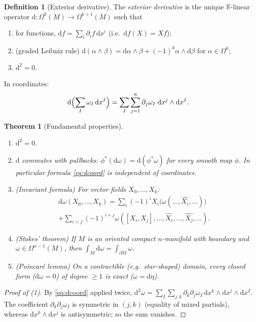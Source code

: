 \documentclass[11pt,a4paper]{article}
\newcounter{thm}[section]
\numberwithin{equation}{section}
\theoremstyle{definition}
\newtheorem{definition}[thm]{Definition}
\theoremstyle{plain}
\newtheorem{theorem}[thm]{Theorem}
\newcommand{\R}{\mathbb{R}}
\newcommand{\dd}{\mathrm{d}}
\begin{document}
\begin{definition}[Exterior derivative]\label{def:d}
The \emph{exterior derivative} is the unique $\R$-linear operator $\dd:\Omega^k(M)\to\Omega^{k+1}(M)$ such that
\begin{enumerate}
  \item for functions, $\dd f=\sum_i\partial_if\,\dd x^i$ (i.e.\ $\dd f(X)=Xf$);
  \item (graded Leibniz rule) $\dd(\alpha\wedge\beta)=\dd\alpha\wedge\beta+(-1)^k\alpha\wedge\dd\beta$ for $\alpha\in\Omega^k$;
  \item $\dd^2=0$.
\end{enumerate}
In coordinates:
\begin{equation}\label{eq:dcoord}
 \dd\Bigl(\sum_I\omega_I\,\dd x^I\Bigr)=\sum_I\sum_{j=1}^n\partial_j\omega_I\;\dd x^j\wedge\dd x^I .
\end{equation}
\end{definition}

\begin{theorem}[Fundamental properties]\label{thm:dprops}
\begin{enumerate}
  \item $\dd^2=0$.
  \item $\dd$ commutes with pullbacks: $\phi^*(\dd\omega)=\dd(\phi^*\omega)$ for every smooth map $\phi$. In particular formula \eqref{eq:dcoord} is independent of coordinates.
  \item (\emph{Invariant formula}) For vector fields $X_0,\dots,X_k$:
  \begin{multline*}
  \dd\omega(X_0,\dots,X_k)=\sum_i(-1)^iX_i\bigl(\omega(\dots,\widehat{X_i},\dots)\bigr)\\
  +\sum_{i<j}(-1)^{i+j}\omega([X_i,X_j],\dots,\widehat{X_i},\dots,\widehat{X_j},\dots).
  \end{multline*}
  \item (\emph{Stokes' theorem}) If $M$ is an oriented compact $n$-manifold with boundary and $\omega\in\Omega^{n-1}(M)$, then $\displaystyle\int_M\dd\omega=\int_{\partial M}\omega$.
  \item (\emph{Poincar\'e lemma}) On a contractible (e.g.\ star-shaped) domain, every closed form ($\dd\omega=0$) of degree $\ge1$ is exact ($\omega=\dd\eta$).
\end{enumerate}
\end{theorem}
\begin{proof}[Proof of (1)]
By \eqref{eq:dcoord} applied twice,
$\dd^2\omega=\sum_I\sum_{j,k}\partial_k\partial_j\omega_I\,\dd x^k\wedge\dd x^j\wedge\dd x^I.$
The coefficient $\partial_k\partial_j\omega_I$ is symmetric in $(j,k)$ (equality of mixed partials), whereas $\dd x^k\wedge\dd x^j$ is antisymmetric; so the sum vanishes.
\end{proof}
\end{document}
